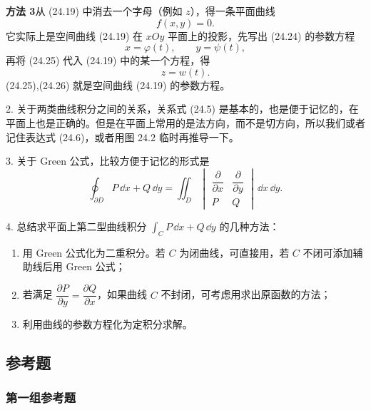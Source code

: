\textbf{方法 3}\quad 从 (24.19) 中消去一个字母（例如 $z$），得一条平面曲线
\begin{equation}
  f(x,y)=0.
  \tag{24.24}
  \label{eq:24.24}
\end{equation}
它实际上是空间曲线 (24.19) 在 $xOy$ 平面上的投影，先写出 (24.24) 的参数方程
\begin{equation}
  x=\varphi(t),\qquad y=\psi(t),
  \tag{24.25}
  \label{eq:24.25}
\end{equation}
再将 (24.25) 代入 (24.19) 中的某一个方程，得
\begin{equation}
  z=w(t).
  \tag{24.26}
  \label{eq:24.26}
\end{equation}
(24.25),(24.26) 就是空间曲线 (24.19) 的参数方程。

2. 关于两类曲线积分之间的关系，关系式 (24.5) 是基本的，也是便于记忆的，在平面上也是正确的。但是在平面上常用的是法方向，而不是切方向，所以我们或者记住表达式 (24.6)，或者用图 24.2 临时再推导一下。

3. 关于 Green 公式，比较方便于记忆的形式是
\[
  \oint_{\partial D}P\,\dd x+Q\,\dd y
  =\iint_D
  \begin{vmatrix}
    \dfrac{\partial}{\partial x}&\dfrac{\partial}{\partial y}\\[4pt]
    P&Q
  \end{vmatrix}
  \,\dd x\,\dd y.
\]

4. 总结求平面上第二型曲线积分 $\displaystyle\int_CP\,\dd x+Q\,\dd y$ 的几种方法：
\begin{enumerate}[label=(\arabic*)]
  \item 用 Green 公式化为二重积分。若 $C$ 为闭曲线，可直接用，若 $C$ 不闭可添加辅助线后用 Green 公式；
  \item 若满足 $\dfrac{\partial P}{\partial y}=\dfrac{\partial Q}{\partial x}$，如果曲线 $C$ 不封闭，可考虑用求出原函数的方法；
  \item 利用曲线的参数方程化为定积分求解。
\end{enumerate}

\subsection{参考题}

\subsubsection*{第一组参考题}

